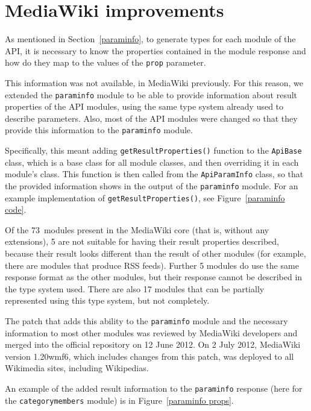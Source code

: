 \chapter{MediaWiki improvements}
\label{mw improvements}

As mentioned in Section~\ref{paraminfo}, to generate types for each module of the \ac{API},
it is necessary to know the properties contained in the module response
and how do they map to the values of the \texttt{prop} parameter.

This information was not available, in MediaWiki previously.
For this reason, we extended the \texttt{paraminfo} module
to be able to provide information about result properties
of the \ac{API} modules, using the same type system already used to describe parameters.
Also, most of the \ac{API} modules were changed so that they provide this information to the \texttt{paraminfo} module.

Specifically, this meant adding \texttt{getResultProperties()} function to the \texttt{Api\-Base} class,
which is a base class for all module classes, and then overriding it in each module's class.
This function is then called from the \texttt{ApiParamInfo} class,
so that the provided information shows in the output of the \texttt{paraminfo} module.
For an example implementation of \texttt{getResultProperties()}, see Figure~\ref{paraminfo code}.

Of the 73~modules present in the MediaWiki core (that is, without any extensions),
5 are not suitable for having their result properties described,
because their result looks different than the result of other modules (for example, there are modules that produce \acs{RSS} feeds).
Further 5 modules do use the same response format as the other modules,
but their response cannot be described in the type system used.
There are also 17 modules that can be partially represented using this type system, but not completely.

The patch that adds this ability to the \texttt{paraminfo} module and the necessary
information to most other modules was reviewed by MediaWiki developers and merged into the official repository
on 12 June 2012.
On 2 July 2012, MediaWiki version 1.20wmf6, which includes changes from this patch, was deployed to all Wikimedia sites, including Wikipedias.

An example of the added result information to the \texttt{paraminfo} response (here for the \texttt{categorymembers} module) is in Figure~\ref{paraminfo props}.

